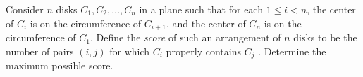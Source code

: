 Consider $n$ disks $C_{1}, C_{2}, \ldots , C_{n}$ in a plane such that for each $1 \leq i < n$, the center of $C_{i}$ is on the circumference of $C_{i+1}$, and the center of $C_{n}$ is on the circumference of $C_{1}$. Define the \emph{score} of such an arrangement of $n$ disks to be the number of pairs $(i, j )$ for which $C_{i}$ properly contains $C_{j}$ . Determine the maximum possible score.